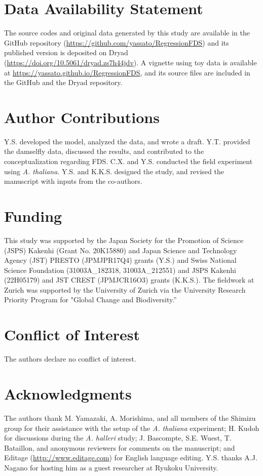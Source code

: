 \documentclass[12pt,]{article}
\begin{document}
\section*{Data Availability Statement}
The source codes and original data generated by this study are available in the GitHub repository (\url{https://github.com/yassato/RegressionFDS}) and its published version is deposited on Dryad (\url{https://doi.org/10.5061/dryad.zs7h44jdv}). A vignette using toy data is available at \url{https://yassato.github.io/RegressionFDS}, and its source files are included in the GitHub and the Dryad repository.

\section*{Author Contributions}
Y.S. developed the model, analyzed the data, and wrote a draft. Y.T. provided the damselfly data, discussed the results, and contributed to the conceptualization regarding FDS. C.X. and Y.S. conducted the field experiment using \textit{A. thaliana}. Y.S. and K.K.S. designed the study, and revised the manuscript with inputs from the co-authors.

\section*{Funding}
This study was supported by the Japan Society for the Promotion of Science (JSPS) Kakenhi (Grant No. 20K15880) and Japan Science and Technology Agency (JST) PRESTO (JPMJPR17Q4) grants (Y.S.) and Swiss National Science Foundation (31003A\_182318, 31003A\_212551) and JSPS Kakenhi (22H05179) and JST CREST (JPMJCR16O3) grants (K.K.S.). The fieldwork at Zurich was supported by the University of Zurich via the University Research Priority Program for "Global Change and Biodiversity.”

\section*{Conflict of Interest}
The authors declare no conflict of interest.

\section*{Acknowledgments}
The authors thank M. Yamazaki, A. Morishima, and all members of the Shimizu group for their assistance with the setup of the \textit{A. thaliana} experiment; H. Kudoh for discussions during the \textit{A. halleri} study; J. Bascompte, S.E. Wuest, T. Bataillon, and anonymous reviewers for comments on the manuscript; and Editage (\url{http://www.editage.com}) for English language editing. Y.S. thanks A.J. Nagano for hosting him as a guest researcher at Ryukoku University. 
\end{document}
